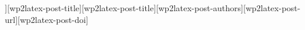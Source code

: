 \beginarticle[[wp2latex-post-subtitle]]{[wp2latex-post-title]}{[wp2latex-post-title]}{[wp2latex-post-authors]}{[wp2latex-post-url]}{[wp2latex-post-doi]}

\begin{multicols}{2}
\end{multicols}